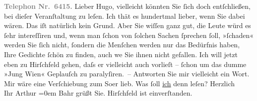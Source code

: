 \begin{ledgroupsized}[t]{13cm}
           \pstart
           \textcolor{gray}{\textbf{Telephon Nr. 6415.}}\pend
           \pstart
           Lieber Hugo, vielleicht könnten Sie ſich doch entſchließen, bei
               dieſer Veranſtaltung zu leſen. Ich thät es hundertmal lieber, wenn Sie dabei wären.
               Das iſt natürlich kein Grund. Aber Sie wiſſen ganz gut, die Leute würd es ſehr
               intereſſiren {\pb}und, wenn man ſchon von ſolchen Sachen
               ſprechen ſoll, »ſchaden« werden Sie ſich nicht, ſondern die Menſchen werden nur das
               Bedürfnis haben, Ihre Gedichte ſchön zu finden, auch we{\geminationn}
               Sie ihnen nicht gefallen. Ich will jetzt eben zu Hirſchfeld gehen, daſs {\pb}er vielleicht auch
               vorlieſt – ſchon um das dumme »Jung Wien«
               Geplauſch zu paralyſiren. –\pend
           \pstart
           Antworten Sie mir vielleicht ein Wort.\pend
           \pstart
           Mir wäre eine Verſchiebung zum So{\geminationm}er lieb. Was ſoll \uline{ich} denn leſen?\pend
           \pstart
           {\pb}Herzlich{\\[\baselineskip]}Ihr \spacefill\mbox{Arthur}\pend
           \leftskip=0em{}\pstart
           \noindent{}Bahr grüßt Sie.\pend
           \pstart
           \noindent{}Hirſchfeld ist einverſtanden.\pend
           \pstart
           \textcolor{gray}{\textbf{\label{T_L00649-1v}\label{T_L00649-1h}}}\pend
           
         
         \endnumbering{}\end{ledgroupsized}  \newcommand{\dateiname}{L00649}\newcommand{\titel}{Arthur Schnitzler an Hugo von Hofmannsthal, 12. 3. 1897}\newcommand{\editorInnen}{ Martin Anton Müller und Gerd-Hermann Susen}
      